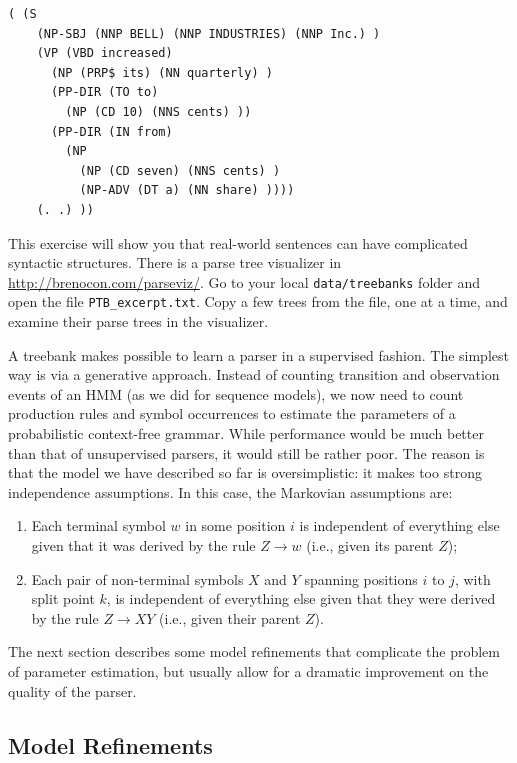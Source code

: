 \begin{verbatim}
( (S
    (NP-SBJ (NNP BELL) (NNP INDUSTRIES) (NNP Inc.) )
    (VP (VBD increased)
      (NP (PRP$ its) (NN quarterly) )
      (PP-DIR (TO to)
        (NP (CD 10) (NNS cents) ))
      (PP-DIR (IN from)
        (NP
          (NP (CD seven) (NNS cents) )
          (NP-ADV (DT a) (NN share) ))))
    (. .) ))
\end{verbatim}

\begin{exercise}\label{exer:treebank}
This exercise will show you that real-world sentences can have complicated syntactic structures. 
There is a parse tree visualizer in \url{http://brenocon.com/parseviz/}. 
Go to your local {\tt data/treebanks} folder and open the file {\tt PTB\_excerpt.txt}. 
Copy a few trees from the file, one at a time, and examine their parse trees in the visualizer.  
\end{exercise}

A treebank makes possible to learn a parser in a supervised fashion. The simplest way is via a 
generative approach. Instead of counting transition and observation events of an HMM 
(as we did for sequence models), we now need to count production rules and symbol occurrences to 
estimate the parameters of a probabilistic context-free grammar. 
While performance would be much better than that of 
unsupervised parsers, it would still be rather poor. 
The reason is that the model we have described so far is oversimplistic: 
it makes too strong independence assumptions. In this case, the Markovian assumptions are: 
\begin{enumerate}
\item Each terminal symbol $w$ in some position $i$ is independent of everything else given that it was 
derived by the rule $Z \rightarrow w$ (i.e., given its parent $Z$);
\item Each pair of non-terminal symbols $X$ and $Y$ spanning positions $i$ to $j$, with 
split point $k$, is independent of everything else given that they were derived  
by the rule $Z \rightarrow X Y$ (i.e., given their parent $Z$). 
\end{enumerate}

The next section describes some model refinements that complicate the problem of parameter estimation, 
but usually allow for a dramatic improvement on the quality of the parser.


\subsection{Model Refinements}

